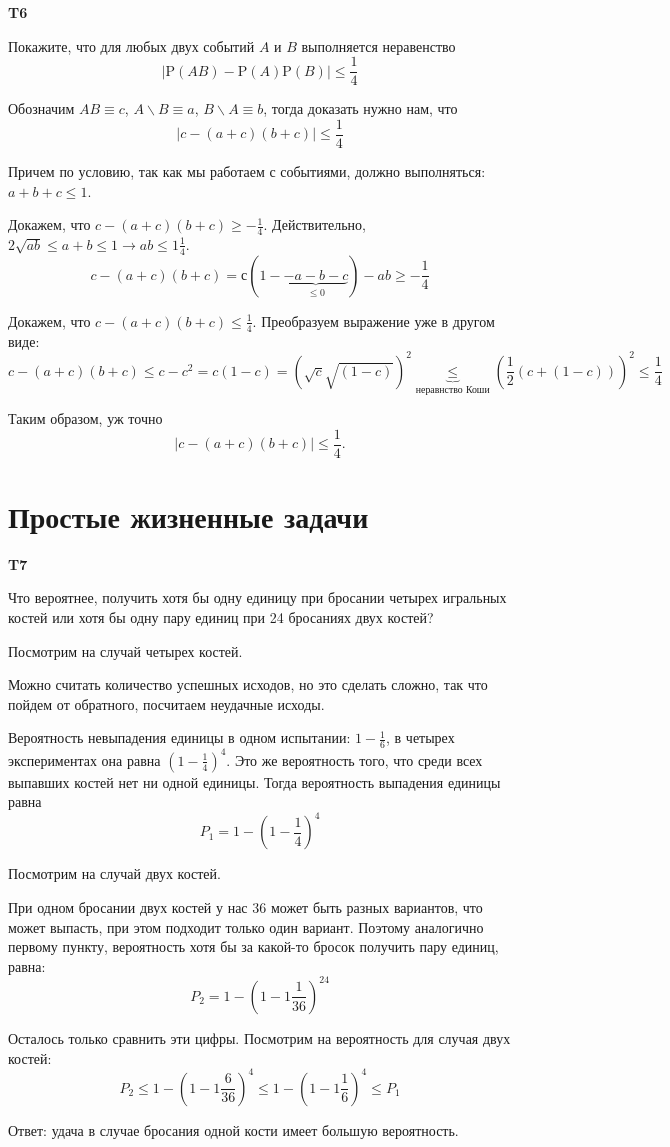 \documentclass[a4paper,12pt]{article} %
\begin{document}
\begin{example}\textbf{T6}

Покажите, что для любых двух событий $A$ и $B$ выполняется неравенство
$$
|\mathrm{P}(A B)-\mathrm{P}(A) \mathrm{P}(B)| \leq \frac{1}{4}
$$

Обозначим $ A B\equiv c$, $ A\backslash B\equiv a$, $ B\backslash A\equiv b$, тогда доказать нужно нам, что
$$ |c-(a+c)(b+c)|\le \frac{1}{4} $$

Причем по условию, так как мы работаем с событиями, должно выполняться: $ a+b+c\le 1$.

Докажем, что $ c-(a+c)(b+c)\ge -\frac{1}{4}$. Действительно, $ 2\sqrt{ab}\le a+b\le 1 \rightarrow ab\le 1\frac{1}{4}$.
\[ c-(a+c)(b+c)=с(1-\underbrace{-a-b-c}_{\le 0})-ab \ge -\frac{1}{4}\]



Докажем, что $ c-(a+c)(b+c)\le \frac{1}{4}$. Преобразуем выражение уже в другом виде:
\[ c-(a+c)(b+c)\le c-c^2=c(1-c)=(\sqrt{c}\sqrt{(1-c)})^2\underbrace{\le}_{\text{неравнство Коши}}
\left(\frac{1}{2} ( c + ( 1-c ))
\right)^2 \le\frac{1}{4}\]

Таким образом, уж точно
$$ |c-(a+c)(b+c)|\le \frac{1}{4}. $$

\end{example}






\section{Простые жизненные задачи}


\begin{example}\textbf{T7}

Что вероятнее, получить хотя бы одну единицу при бросании четырех игральных костей 
или хотя бы одну пару единиц при 24 бросаниях двух костей?

Посмотрим на случай четырех костей.

Можно считать количество успешных исходов, но это сделать сложно, так что пойдем от обратного, посчитаем неудачные исходы.

Вероятность невыпадения единицы в одном испытании: $ 1-\frac{1}{6}$, в четырех экспериментах она равна $ (1-\frac{1}{4})^4$. 
Это же вероятность того, что среди всех выпавших костей нет ни одной единицы. 
Тогда вероятность выпадения единицы равна 
$$P_1= 1- (1-\frac{1}{4})^4$$


Посмотрим на случай двух костей.

При одном бросании двух костей у нас 36 может быть разных вариантов, что может выпасть, при этом подходит только один вариант.
Поэтому  аналогично первому пункту, вероятность хотя бы за какой-то бросок получить пару единиц, равна:
$$P_2= 1-(1-1\frac{1}{36})^{24} $$

Осталось только сравнить эти цифры. Посмотрим на вероятность для случая двух костей:
$$P_2\le 1-(1-1\frac{6}{36})^{4}\le 1-(1-1\frac{1}{6})^{4}\le P_1$$

Ответ: удача в случае бросания одной кости имеет большую вероятность.


\end{example}
\end{document}
